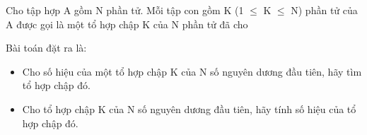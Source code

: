 Cho tập hợp A gồm N phần tử. Mỗi tập con gồm K (1  $\le$  K  $\le$  N) phần tử của A được gọi là một tổ hợp chập K của N phần tử đã cho

Bài toán đặt ra là:
\begin{itemize}
	\item Cho số hiệu của một tổ hợp chập K của N số nguyên dương đầu tiên, hãy tìm tổ hợp chập đó.
	\item Cho tổ hợp chập K của N số nguyên dương đầu tiên, hãy tính số hiệu của tổ hợp chập đó.
\end{itemize}